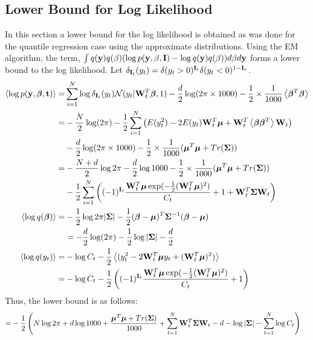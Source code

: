 \begin{appendices}
\subsection{Lower Bound for Log Likelihood}
\label{sec:class_lik}
In this section a lower bound for the log likelihood is obtained as was done for the quantile regression case using the approximate distributions. Using the EM algorithm, the term, $\int q(\mathbf{y})q(\beta)(\log p(\mathbf{y},\beta,\mathbf{I})-\log q(\mathbf{y})q(\beta)) d\beta d\mathbf{y}$ forms a lower bound to the log likelihood. Let $\delta_{\mathbf{I}_t}(y_t)=\delta(y_t>0)^{\mathbf{I}_t}\delta(y_t<0)^{1-\mathbf{I}_t}$.
\begin{align}
\nonumber \left\langle\log p(\mathbf{y},\bm{\beta},{\mathbf{t}})\right\rangle=&\sum_{i=1}^{N}\log\delta_{\mathbf{I}_t}(y_t){\mathcal{N}}(y_t|\mathbf{W}_t^T\bm{\beta},1)-\frac{d}{2}\log(2\pi\times1000)-\frac{1}{2}\times\frac{1}{1000}\left\langle\bm{\beta}^T\bm{\beta}\right\rangle\\
\nonumber =&-\frac{N}{2}\log(2\pi)-\frac{1}{2}\sum_{i=1}^{N}\left( E(y_t^2)-2E(y_t)\mathbf{W}_t^T{\boldsymbol{\mu}}+\mathbf{W}_t^T\left\langle\bm{\beta}\bm{\beta}^T\right\rangle\mathbf{W}_t\right)\\
\nonumber &-\frac{d}{2}\log(2\pi\times1000)-\frac{1}{2}\times\frac{1}{1000}({\boldsymbol{\mu}}^T{\boldsymbol{\mu}}+Tr({\mathbf{\Sigma}}))\\
\nonumber=&-\frac{N+d}{2}\log 2\pi-\frac{d}{2}\log 1000-\frac{1}{2}\times\frac{1}{1000}({\boldsymbol{\mu}}^T{\boldsymbol{\mu}}+Tr({\mathbf{\Sigma}}))\\
&-\frac{1}{2}\sum_{i=1}^{N}\left((-1)^{\mathbf{I}_t}\frac{\mathbf{W}_t^T{\boldsymbol{\mu}}\exp(-\frac{1}{2}(\mathbf{W}_t^T{\boldsymbol{\mu}})^2)}{C_t}+1+\mathbf{W}_t^T{\mathbf{\Sigma}}\mathbf{W}_t\right)\\
\nonumber\left\langle\log q(\bm{\beta})\right\rangle=&-\frac{1}{2}\log 2\pi|{\mathbf{\Sigma}}|-\frac{1}{2}(\bm{\beta}-{\boldsymbol{\mu}})^T{\mathbf{\Sigma}}^{-1}(\bm{\beta}-{\boldsymbol{\mu}})\\
&=-\frac{d}{2}\log(2\pi)-\frac{1}{2}\log|{\mathbf{\Sigma}}|-\frac{d}{2}\\
\nonumber\left\langle\log q(y_t)\right\rangle=&-\log C_t-\frac{1}{2}\left\langle(y_t^2-2\mathbf{W}_t^T{\boldsymbol{\mu}} y_t+(\mathbf{W}_t^T{\boldsymbol{\mu}})^2)\right\rangle\\
=&-\log C_t-\frac{1}{2}\left((-1)^{\mathbf{I}_t}\frac{\mathbf{W}_t^T{\boldsymbol{\mu}}\exp(-\frac{1}{2}(\mathbf{W}_t^T{\boldsymbol{\mu}})^2)}{C_t}+1\right)
\end{align}
Thus, the lower bound is as follows:
\begin{align}
=&-\frac{1}{2}\left(N\log 2\pi+d\log 1000+\frac{{\boldsymbol{\mu}}^T{\boldsymbol{\mu}}+Tr({\mathbf{\Sigma}})}{1000}+\sum_{t=1}^{N}\mathbf{W}_t^T{\mathbf{\Sigma}}\mathbf{W}_t-d-\log|{\mathbf{\Sigma}}|-\sum_{t=1}^{N}\log C_t\right)
\end{align}
\end{appendices}